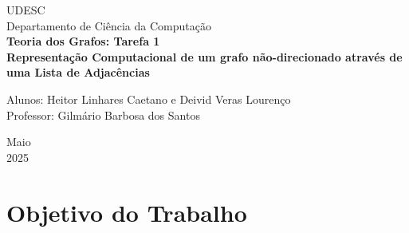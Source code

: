 \documentclass[a4paper, 12pt]{article}
\begin{document}

\begin{titlepage}
	\begin{center}
	

		\Huge{UDESC}\\
		\large{Departamento de Ciência da Computação}\\ 
		\vspace{15pt}
        \vspace{95pt}
        \textbf{\LARGE{Teoria dos Grafos: Tarefa 1}}\\

		\textbf{Representação Computacional de um grafo não-direcionado através de uma Lista de Adjacências}
		\vspace{3,5cm}
	\end{center}
	
	\begin{flushleft}
		\begin{tabbing}
			Alunos: Heitor Linhares Caetano e Deivid Veras Lourenço \\
			Professor: Gilmário Barbosa dos Santos \\
	      \setlength{\labelsep}{\leftmargin}
	\end{tabbing}
 \end{flushleft}
	\vspace{1cm}
	
	\begin{center}
		\vspace{\fill}
			 Maio\\
			 2025
			\end{center}
\end{titlepage}


\newpage
\newpage
\tableofcontents
\thispagestyle{empty}

\newpage
{}

\section{Objetivo do Trabalho}
\end{document}
